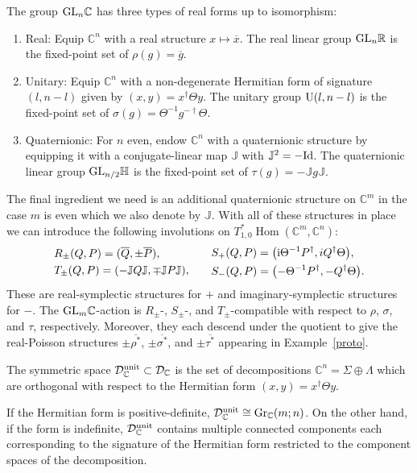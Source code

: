 \documentclass[pdftex]{sigma}
\numberwithin{equation}{section}
\DeclareMathOperator{\Hom}{Hom}
\DeclareMathOperator{\Gr}{Gr}
\newcommand{\R}{\mathbb{R}}
\newcommand{\C}{\mathbb{C}}
\newcommand{\D}{\mathcal{D}}
\newcommand{\Q}{\mathbb{H}}
\newcommand{\Id}{{\rm Id}}
\begin{document}
The group ${\rm GL}_n\C$ has three types of real forms up to isomorphism:
\begin{enumerate}\itemsep=0pt
	\item Real: Equip $\C^n$ with a real structure $x\mapsto\overline{x}$. The real linear group ${\rm GL}_n\R$ is the fixed-point set of $\rho(g)=\overline{g}$.
	\item Unitary: Equip $\C^n$ with a non-degenerate Hermitian form of signature $(l,n-l)$ given by $(x,y)=x^\dagger \Theta y$. The unitary group ${\rm U}(l,n-l)$ is the fixed-point set of $\sigma(g)=\Theta^{-1}g^{-\dagger}\Theta$.
	\item Quaternionic: For $n$ even, endow $\C^n$ with a quaternionic structure by equipping it with a conjugate-linear map $\mathbb{J}$ with $\mathbb{J}^2=-\Id$. The quaternionic linear group ${\rm GL}_{n/2}\Q$ is the fixed-point set of $\tau(g)=-\mathbb{J}g\mathbb{J}$.
\end{enumerate}
The final ingredient we need is an additional quaternionic structure on $\C^m$ in the case $m$ is even which we also denote by $\mathbb{J}$. With all of these structures in place we can introduce the following involutions on $T^*_{1,0}\Hom(\C^m,\C^n)$:
\begin{equation}\label{list_of_RST}
	\begin{aligned}
		&R_\pm(Q,P)=(\overline{Q},\pm\overline{P}), \\
		&T_\pm(Q,P)=(-\mathbb{J}Q\mathbb{J},\mp\mathbb{J}P\mathbb{J}),
	\end{aligned}
	\qquad
	\begin{aligned}
		&S_+(Q,P)=\bigl({\rm i}\Theta^{-1}P^\dagger, iQ^\dagger \Theta\bigr),\\
		&S_-(Q,P)=\bigl(-\Theta^{-1}P^\dagger, -Q^\dagger \Theta\bigr).
	\end{aligned}
\end{equation}
These are real-symplectic structures for $+$ and imaginary-symplectic structures for $-$. The ${\rm GL}_m\C$-action is $R_\pm$-, $S_\pm$-, and $T_\pm$-compatible with respect to $\rho$, $\sigma$, and $\tau$, respectively. Moreover, they each descend under the quotient to give the real-Poisson structures $\pm\overline{\rho^*}$, $\pm\overline{\sigma^*}$, and $\pm\overline{\tau^*}$ appearing in Example~\ref{proto}.

\begin{Definition}The symmetric space $\D_{\C}^{\rm unit}\subset\D_{\C}$ is the set of decompositions $\C^n=\Sigma\oplus\Lambda$ which are orthogonal with respect to the Hermitian form $(x,y)=x^\dagger \Theta y$.
\end{Definition}
If the Hermitian form is positive-definite, $\D_{\C}^{\rm unit}\cong\Gr_\C(m;n)$. On the other hand, if the form is indefinite, $\D_{\C}^{\rm unit}$ contains multiple connected components each corresponding to the signature of the Hermitian form restricted to the component spaces of the decomposition.
\end{document}
